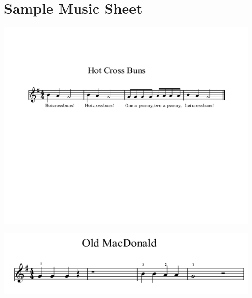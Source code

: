 \chapter{Sample Music Sheet}
\label{sec:appendixe}

\includegraphics[width=17cm]{figures/HotCrossBuns.png}

\includegraphics[width=15cm]{figures/OldMacDonald.png}

